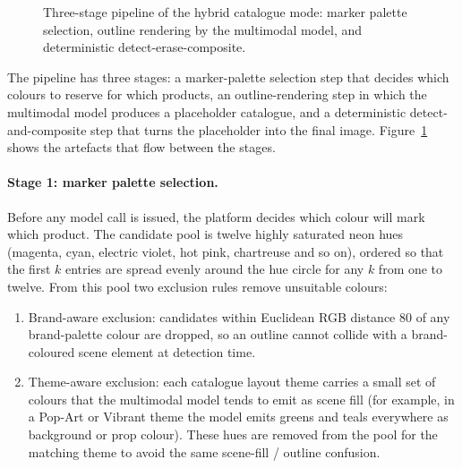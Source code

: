 \begin{figure}[H]
{%
}
\caption{Three-stage pipeline of the hybrid catalogue mode: marker palette selection, outline rendering by the multimodal model, and deterministic detect-erase-composite.}
\label{fig:hybrid-pipeline}
\end{figure}

The pipeline has three stages: a marker-palette selection step that decides which colours to reserve for which products, an outline-rendering step in which the multimodal model produces a placeholder catalogue, and a deterministic detect-and-composite step that turns the placeholder into the final image. Figure~\ref{fig:hybrid-pipeline} shows the artefacts that flow between the stages.

\paragraph{Stage 1: marker palette selection.}
Before any model call is issued, the platform decides which colour will mark which product. The candidate pool is twelve highly saturated neon hues (magenta, cyan, electric violet, hot pink, chartreuse and so on), ordered so that the first $k$ entries are spread evenly around the hue circle for any $k$ from one to twelve. From this pool two exclusion rules remove unsuitable colours:

\begin{enumerate}
\item Brand-aware exclusion: candidates within Euclidean RGB distance $80$ of any brand-palette colour are dropped, so an outline cannot collide with a brand-coloured scene element at detection time.
\item Theme-aware exclusion: each catalogue layout theme carries a small set of colours that the multimodal model tends to emit as scene fill (for example, in a Pop-Art or Vibrant theme the model emits greens and teals everywhere as background or prop colour). These hues are removed from the pool for the matching theme to avoid the same scene-fill / outline confusion.
\end{enumerate}

